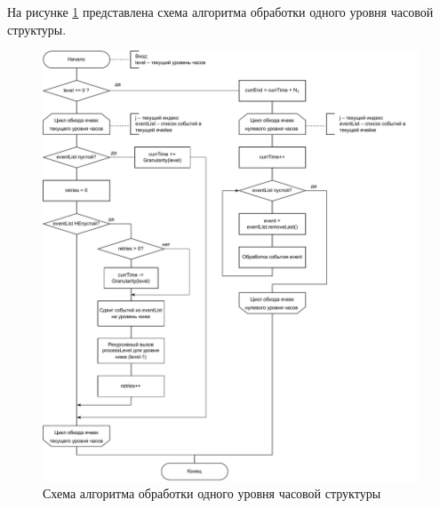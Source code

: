 \clearpage
На рисунке \ref{img:hybrid_processLevel_schema} представлена схема алгоритма обработки одного уровня часовой структуры.
\begin{figure}[h!btp]
	\centering
	\includegraphics[width=1\columnwidth]{inc/img/hybrid_processLevel_schema.pdf}
	\caption{Схема алгоритма обработки одного уровня часовой структуры}
	\label{img:hybrid_processLevel_schema}	
\end{figure}

